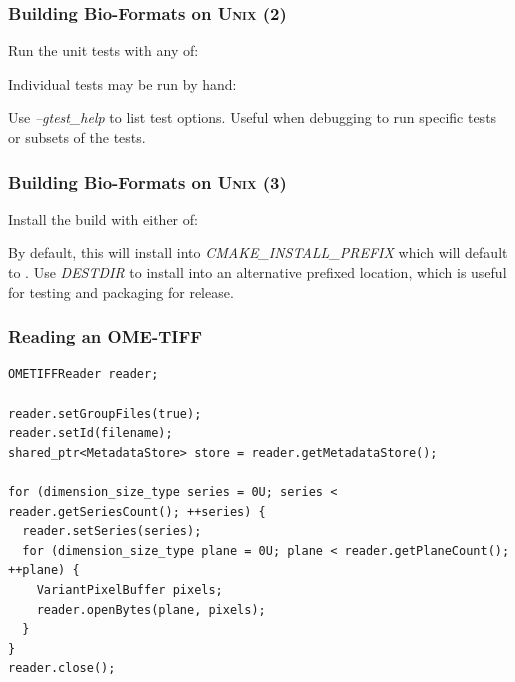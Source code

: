\documentclass{beamer}
\newcommand{\opt}[1]{\textsl{#1}}
\begin{document}
\begin{frame}[fragile]
  \frametitle{Building Bio-Formats on U\textsc{nix} (2)}
  \scriptsize

Run the unit tests with any of:

  \begin{semiverbatim}
\end{semiverbatim}

Individual tests may be run by hand:

  \begin{semiverbatim}
\end{semiverbatim}

Use \opt{--gtest\_help} to list test options.  Useful when debugging
to run specific tests or subsets of the tests.
\end{frame}

\begin{frame}[fragile]
  \frametitle{Building Bio-Formats on U\textsc{nix} (3)}
  \scriptsize

Install the build with either of:

  \begin{semiverbatim}
\end{semiverbatim}

By default, this will install into \opt{CMAKE\_INSTALL\_PREFIX} which
will default to .  Use \opt{DESTDIR} to install into
an alternative prefixed location, which is useful for testing and
packaging for release.
\end{frame}

\begin{frame}[fragile]
  \frametitle{Reading an OME-TIFF}
  \begin{lstlisting}
OMETIFFReader reader;

reader.setGroupFiles(true);
reader.setId(filename);
shared_ptr<MetadataStore> store = reader.getMetadataStore();

for (dimension_size_type series = 0U; series < reader.getSeriesCount(); ++series) {
  reader.setSeries(series);
  for (dimension_size_type plane = 0U; plane < reader.getPlaneCount(); ++plane) {
    VariantPixelBuffer pixels;
    reader.openBytes(plane, pixels);
  }
}
reader.close();
  \end{lstlisting}
\end{frame}
\end{document}
